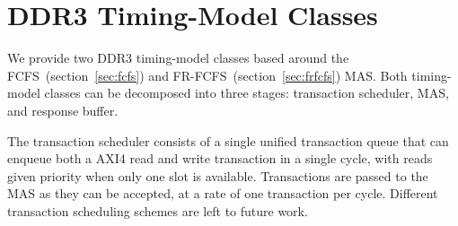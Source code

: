 \begin{table}[htb]
\begin{center}
\end{center}
\caption{Programmable registers of the bank conflict timing-model.}
\label{tbl:bc-programmable-registers}
\end{table}%

\clearpage
\section{DDR3 Timing-Model Classes}

We provide two DDR3 timing-model classes based around the
FCFS~(section~\ref{sec:fcfs}) and FR-FCFS~(section~\ref{sec:frfcfs}) MAS. Both
timing-model classes can be decomposed into three stages: transaction
scheduler, MAS, and response buffer.

The transaction scheduler consists of a single unified transaction queue that
can enqueue both a AXI4 read and write transaction in a single cycle, with reads
given priority when only one slot is available. Transactions are passed to the
MAS as they can be accepted, at a rate of one transaction per cycle.  Different
transaction scheduling schemes are left to future work.

